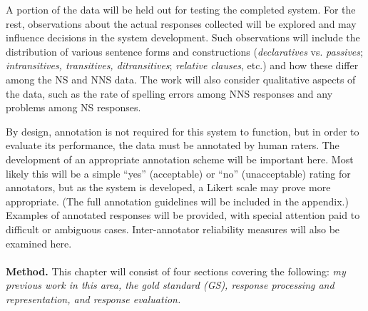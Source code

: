 \documentclass[11pt]{article}
\begin{document}
\par A portion of the data will be held out for testing the completed system. For the rest, observations about the actual responses collected will be explored and may influence decisions in the system development. Such observations will include the distribution of various sentence forms and constructions (\textit{declaratives} vs. \textit{passives}; \textit{intransitives, transitives, ditransitives}; \textit{relative clauses}, etc.) and how these differ among the NS and NNS data. The work will also consider qualitative aspects of the data, such as the rate of spelling errors among NNS responses and any problems among NS responses.
\par By design, annotation is not required for this system to function, but in order to evaluate its performance, the data must be annotated by human raters. The development of an appropriate annotation scheme will be important here. Most likely this will be a simple ``yes'' (acceptable) or ``no'' (unacceptable) rating for annotators, but as the system is developed, a Likert scale may prove more appropriate. 
 (The full annotation guidelines will be included in the appendix.) Examples of annotated responses will be provided, with special attention paid to difficult or ambiguous cases. Inter-annotator reliability measures will also be examined here.\\
\\
\textbf{Method.} This chapter will consist of four sections covering the following: \textit{my previous work in this area, the gold standard (GS), response processing and representation, and response evaluation.}\\
\\
\end{document}
